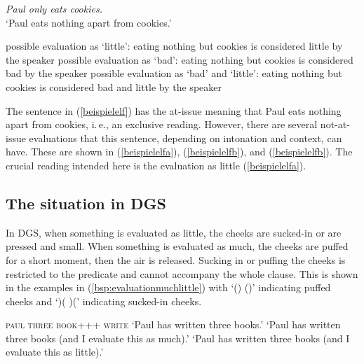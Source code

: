 \begin{exe} 
\ex \textit{Paul only eats cookies.} \\ `Paul eats nothing apart from cookies.' \label{beispielelf} 
\begin{xlist} 
\ex possible evaluation as `little': eating nothing but cookies is considered little by the speaker\label{beispielelfa}
\ex possible evaluation as `bad': eating nothing but cookies is considered bad by the speaker \label{beispielelfb} 
\ex possible evaluation as `bad' and `little': eating nothing but cookies is considered bad and little by the speaker \label{beispielelfc} 
\end{xlist} 
\end{exe}

\noindent The sentence in (\ref{beispielelf}) has the at-issue meaning that Paul eats nothing apart from cookies, i.\,e., an exclusive reading. However, there are several not-at-issue evaluations that this sentence, depending on intonation and context, can have. These are shown in (\ref{beispielelfa}), (\ref{beispielelfb}), and (\ref{beispielelfb}). The crucial reading intended here is the evaluation as little (\ref{beispielelfa}).

\subsection{The situation in DGS}
In DGS, when something is evaluated as little, the cheeks are sucked-in or are pressed and small. When something is evaluated as much, the cheeks are puffed for a short moment, then the air is released. Sucking in or puffing the cheeks is restricted to the predicate and cannot accompany the whole clause. This is shown in the examples in (\ref{bsp:evaluationmuchlittle}) with `() ()' indicating puffed cheeks and `)( )(' indicating sucked-in cheeks.

\begin{exe}
\ex\label{bsp:evaluationmuchlittle}\begin{xlist}
\ex 
{\textsc{paul three book+++ write}}   
\glt `Paul has written three books.'\label{bsp:evaluationmuchlittlea}
\ex {} 
\glt `Paul has written three books (and I evaluate this as much).'\label{bsp:evaluationmuchlittleb}
\ex {} 
\glt `Paul has written three books (and I evaluate this as little).'\label{bsp:evaluationmuchlittlec}
\end{xlist}
\end{exe} 


